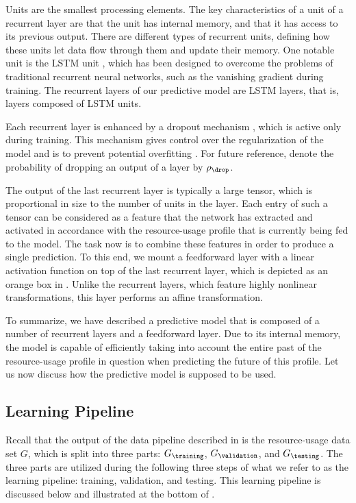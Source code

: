 Units are the smallest processing elements. The key characteristics of a unit of
a recurrent layer are that the unit has internal memory, and that it has access
to its previous output. There are different types of recurrent units, defining
how these units let data flow through them and update their memory. One notable
unit is the \ac{LSTM} unit \cite{hochreiter1997}, which has been designed to
overcome the problems of traditional recurrent neural networks, such as the
vanishing gradient during training. The recurrent layers of our predictive model
are \ac{LSTM} layers, that is, layers composed of \ac{LSTM} units.

Each recurrent layer is enhanced by a dropout mechanism \cite{zaremba2014},
which is active only during training. This mechanism gives control over the
regularization of the model and is to prevent potential overfitting
\cite{hastie2013}. For future reference, denote the probability of dropping an
output of a layer by $\rho_\drop$.

The output of the last recurrent layer is typically a large tensor, which is
proportional in size to the number of units in the layer. Each entry of such a
tensor can be considered as a feature that the network has extracted and
activated in accordance with the resource-usage profile that is currently being
fed to the model. The task now is to combine these features in order to produce
a single prediction. To this end, we mount a feedforward layer with a linear
activation function on top of the last recurrent layer, which is depicted as an
orange box in . Unlike the recurrent layers, which
feature highly nonlinear transformations, this layer performs an affine
transformation.

To summarize, we have described a predictive model that is composed of a number
of recurrent layers and a feedforward layer. Due to its internal memory, the
model is capable of efficiently taking into account the entire past of the
resource-usage profile in question when predicting the future of this profile.
Let us now discuss how the predictive model is supposed to be used.

\subsection{Learning Pipeline}

Recall that the output of the data pipeline described in
 is the resource-usage data set $G$, which is split
into three parts: $G_\training$, $G_\validation$, and $G_\testing$. The three
parts are utilized during the following three steps of what we refer to as the
learning pipeline: training, validation, and testing. This learning pipeline is
discussed below and illustrated at the bottom of .

